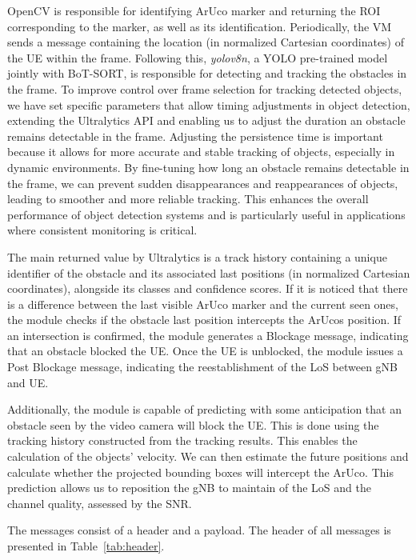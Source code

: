 OpenCV is responsible for identifying ArUco marker and returning the ROI corresponding to the marker, as well as its identification.
Periodically, the VM sends a message containing the location (in normalized Cartesian coordinates) of the UE within the frame\@.
Following this, \emph{yolov8n}, a YOLO pre-trained model jointly with BoT-SORT, is responsible for detecting and tracking the obstacles in the frame.
To improve control over frame selection for tracking detected objects, we have set specific parameters that allow timing adjustments in object detection, extending the Ultralytics API and enabling us to adjust the duration an obstacle remains detectable in the frame.
Adjusting the persistence time is important because it allows for more accurate and stable tracking of objects, especially in dynamic environments.
By fine-tuning how long an obstacle remains detectable in the frame, we can prevent sudden disappearances and reappearances of objects, leading to smoother and more reliable tracking.
This enhances the overall performance of object detection systems and is particularly useful in applications where consistent monitoring is critical.

The main returned value by Ultralytics is a track history containing a unique identifier of the obstacle and its associated last positions (in normalized Cartesian coordinates), alongside its classes and confidence scores.
If it is noticed that there is a difference between the last visible ArUco marker and the current seen ones, the module checks if the obstacle last position intercepts the ArUcos position.
If an intersection is confirmed, the module generates a Blockage message, indicating that an obstacle blocked the UE\@.
Once the UE is unblocked, the module issues a Post Blockage message, indicating the reestablishment of the LoS between gNB and UE.

Additionally, the module is capable of predicting with some anticipation that an obstacle seen by the video camera will block the UE\@.
This is done using the tracking history constructed from the tracking results.
This enables the calculation of the objects' velocity.
We can then estimate the future positions and calculate whether the projected bounding boxes will intercept the ArUco.
This prediction allows us to reposition the gNB to maintain of the LoS and the channel quality, assessed by the SNR\@.

The messages consist of a header and a payload.
The header of all messages is presented in Table~\ref{tab:header}.


